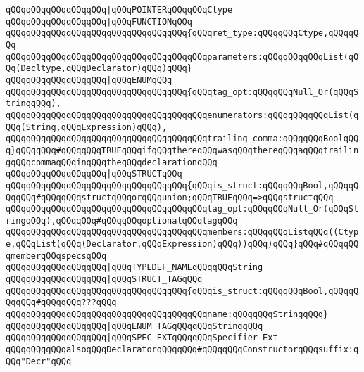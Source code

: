 \verb|qQQqqQQqqQQqqQQqqQQq|\verb#|qQQqPOINTERqQQqqQQqCtype#\newline
\verb|qQQqqQQqqQQqqQQqqQQq|\verb#|qQQqFUNCTIONqQQq#\newline
\verb|qQQqqQQqqQQqqQQqqQQqqQQqqQQqqQQqqQQq{qQQqret_type:qQQqqQQqCtype,qQQqqQQq|\newline
\verb|qQQqqQQqqQQqqQQqqQQqqQQqqQQqqQQqqQQqqQQqparameters:qQQqqQQqqQQqList(qQQq(Decltype,qQQqDeclarator)qQQq)qQQq}|\newline
\verb|qQQqqQQqqQQqqQQqqQQq|\verb#|qQQqENUMqQQq#\newline
\verb|qQQqqQQqqQQqqQQqqQQqqQQqqQQqqQQqqQQq{qQQqtag_opt:qQQqqQQqNull_Or(qQQqStringqQQq),|\newline
\verb|qQQqqQQqqQQqqQQqqQQqqQQqqQQqqQQqqQQqqQQqenumerators:qQQqqQQqqQQqList(qQQq(String,qQQqExpression)qQQq),|\newline
\verb|qQQqqQQqqQQqqQQqqQQqqQQqqQQqqQQqqQQqqQQqtrailing_comma:qQQqqQQqBoolqQQq}qQQqqQQq#qQQqqQQqTRUEqQQqifqQQqthereqQQqwasqQQqthereqQQqaqQQqtrailingqQQqcommaqQQqinqQQqtheqQQqdeclarationqQQq|\newline
\verb|qQQqqQQqqQQqqQQqqQQq|\verb#|qQQqSTRUCTqQQq#\newline
\verb|qQQqqQQqqQQqqQQqqQQqqQQqqQQqqQQqqQQq{qQQqis_struct:qQQqqQQqBool,qQQqqQQqqQQq#qQQqqQQqstructqQQqorqQQqunion;qQQqTRUEqQQq=>qQQqstructqQQq|\newline
\verb|qQQqqQQqqQQqqQQqqQQqqQQqqQQqqQQqqQQqqQQqtag_opt:qQQqqQQqNull_Or(qQQqStringqQQq),qQQqqQQq#qQQqqQQqoptionalqQQqtagqQQq|\newline
\verb|qQQqqQQqqQQqqQQqqQQqqQQqqQQqqQQqqQQqqQQqmembers:qQQqqQQqListqQQq((Ctype,qQQqList(qQQq(Declarator,qQQqExpression)qQQq))qQQq)qQQq}qQQq#qQQqqQQqmemberqQQqspecsqQQq|\newline
\verb|qQQqqQQqqQQqqQQqqQQq|\verb#|qQQqTYPEDEF_NAMEqQQqqQQqString#\newline
\verb|qQQqqQQqqQQqqQQqqQQq|\verb#|qQQqSTRUCT_TAGqQQq#\newline
\verb|qQQqqQQqqQQqqQQqqQQqqQQqqQQqqQQqqQQq{qQQqis_struct:qQQqqQQqBool,qQQqqQQqqQQq#qQQqqQQq???qQQq|\newline
\verb|qQQqqQQqqQQqqQQqqQQqqQQqqQQqqQQqqQQqqQQqname:qQQqqQQqStringqQQq}|\newline
\verb|qQQqqQQqqQQqqQQqqQQq|\verb#|qQQqENUM_TAGqQQqqQQqStringqQQq#\newline
\verb|qQQqqQQqqQQqqQQqqQQq|\verb#|qQQqSPEC_EXTqQQqqQQqSpecifier_Ext#\newline
\newline
\verb|qQQqqQQqqQQqalsoqQQqDeclaratorqQQqqQQq#qQQqqQQqConstructorqQQqsuffix:qQQq"Decr"qQQq|\newline
